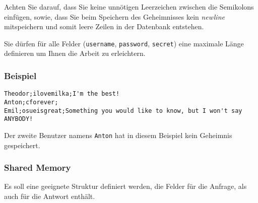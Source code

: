 Achten Sie darauf, dass Sie keine unnötigen Leerzeichen zwischen
die Semikolons einfügen, sowie, dass Sie beim Speichern des Geheimnisses kein
\textit{newline} mitspeichern und somit leere Zeilen in der Datenbank
entstehen.

Sie dürfen für alle Felder (\texttt{username}, \texttt{password},
\texttt{secret}) eine maximale Länge definieren um Ihnen die Arbeit zu
erleichtern.

\subsubsection*{Beispiel}

\begin{verbatim}
Theodor;ilovemilka;I'm the best!
Anton;cforever;
Emil;osueisgreat;Something you would like to know, but I won't say ANYBODY!
\end{verbatim}

Der zweite Benutzer namens \texttt{Anton} hat in diesem Beispiel kein Geheimnis
gespeichert.


\subsubsection*{Shared Memory}

Es soll eine geeignete Struktur definiert werden, die Felder für die Anfrage,
als auch für die Antwort enthält.


\osueguidelinesthree


